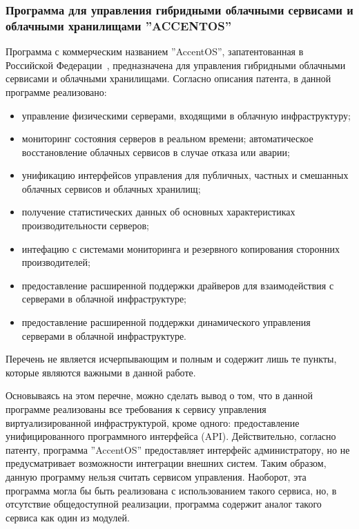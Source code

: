 \subsubsection*{Программа для управления гибридными облачными сервисами и облачными хранилищами
''ACCENTOS''}
Программа с коммерческим названием ''AccentOS'', запатентованная в Российской Федерации~\cite{accentos}, предназначена для управления гибридными облачными сервисами и облачными хранилищами.
Согласно описания патента, в данной программе реализовано:
\begin{itemize}
    \item управление физическими серверами, входящими в облачную инфраструктуру; 
    \item мониторинг состояния серверов в реальном времени; автоматическое восстановление облачных сервисов в случае отказа или аварии;
    \item унификацию интерфейсов управления для публичных, частных и смешанных облачных сервисов и облачных хранилищ;
    \item получение статистических данных об основных характеристиках производительности серверов;
    \item интефацию с системами мониторинга и резервного копирования сторонних производителей;
    \item предоставление расширенной поддержки драйверов для взаимодействия с серверами в облачной инфраструктуре;
    \item предоставление расширенной поддержки динамического управления серверами в облачной инфраструктуре.
\end{itemize}
Перечень не является исчерпывающим и полным и содержит лишь те пункты, которые являются важными в данной работе.

Основываясь на этом перечне, можно сделать вывод о том, что в данной программе реализованы все требования к сервису управления виртуализированной инфраструктурой, кроме одного: предоставление унифицированного программного интерфейса (API).
Действительно, согласно патенту, программа ''AccentOS'' предоставляет интерфейс администратору, но не предусматривает возможности интеграции внешних систем.
Таким образом, данную программу нельзя считать сервисом управления.
Наоборот, эта программа могла бы быть реализована с использованием такого сервиса, но, в отсутствие общедоступной реализации, программа содержит аналог такого сервиса как один из модулей.
